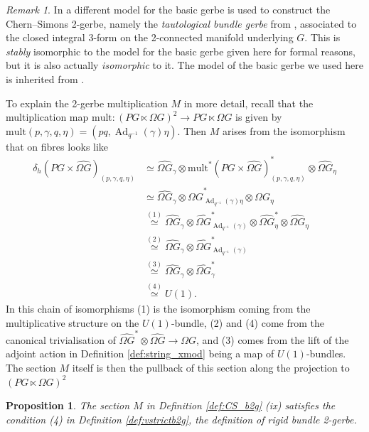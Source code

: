 \documentclass[12pt]{amsart}
\DeclareMathOperator{\Ad}{Ad}
\theoremstyle{plain}
\newtheorem{proposition}[theorem]{Proposition}
\theoremstyle{definition}
\theoremstyle{remark}
\newtheorem{remark}[theorem]{Remark}
\numberwithin{equation}{section}
\newcommand{\mult}{\mathrm{mult}}
\newcommand{\<}{\langle}
\renewcommand{\>}{\rangle}
\begin{document}
\begin{remark}
In \cite{StevPhD,JohnsonPhD,CJMSW} a different model for the basic gerbe is used to construct the Chern--Simons 2-gerbe, namely the \emph{tautological bundle gerbe} from \cite{Mur}, associated to the closed integral 3-form on the 2-connected manifold underlying $G$. 
This is \emph{stably} isomorphic to the model for the basic gerbe given here for formal reasons, but it is also actually \emph{isomorphic} to it.
The model of the basic gerbe we used here is inherited from \cite{MS03}.
\end{remark}



To explain the 2-gerbe multiplication $M$ in more detail, recall that the multiplication map $\mult\colon (PG\ltimes \Omega G)^2 \to PG\ltimes \Omega G$ is given by $\mult(p,\gamma,q,\eta)=(pq,\Ad_{q^{-1}}(\gamma)\eta)$.
Then $M$ arises from the isomorphism that on fibres looks like
  \begin{align*}
\delta_h(PG\times \widehat{\Omega G})_{(p,\gamma,q,\eta)} 
& \simeq \widehat{\Omega G}_\gamma\otimes \mult^*(PG\times \widehat{\Omega G})^*_{(p,\gamma,q,\eta)}\otimes \widehat{\Omega G}_\eta\\
&\simeq  \widehat{\Omega G}_\gamma\otimes \widehat{\Omega G}^*_{\Ad_{q^{-1}}(\gamma)\eta}\otimes \widehat{\Omega G}_\eta\\
&\stackrel{(1)}{\simeq} 
\widehat{\Omega G}_\gamma\otimes \widehat{\Omega G}^*_{\Ad_{q^{-1}}(\gamma)}\otimes \widehat{\Omega G}^*_\eta\otimes \widehat{\Omega G}_\eta\\
&\stackrel{(2)}{\simeq} 
\widehat{\Omega G}_\gamma\otimes \widehat{\Omega G}^*_{\Ad_{q^{-1}}(\gamma)}\\
&\stackrel{(3)}{\simeq} 
\widehat{\Omega G}_\gamma\otimes \widehat{\Omega G}^*_\gamma\\
&\stackrel{(4)}{\simeq}  U(1).
\end{align*}
In this chain of isomorphisms (1) is the isomorphism coming from the multiplicative structure on the $U(1)$-bundle, (2) and (4) come from the canonical trivialisation of $\widehat{\Omega G}^*\otimes \widehat{\Omega G} \to \Omega G$, and (3) comes from the lift of the adjoint action in Definition \ref{def:string_xmod} being a map of $U(1)$-bundles.
The section $M$ itself is then the pullback of this section along the projection to $(PG\ltimes \Omega G)^2$






\begin{proposition}
The section $M$ in Definition \ref{def:CS_b2g} (ix) satisfies the condition (4) in Definition \ref{def:vstrictb2g}, the definition of rigid bundle 2-gerbe.
\end{proposition}
\end{document}
